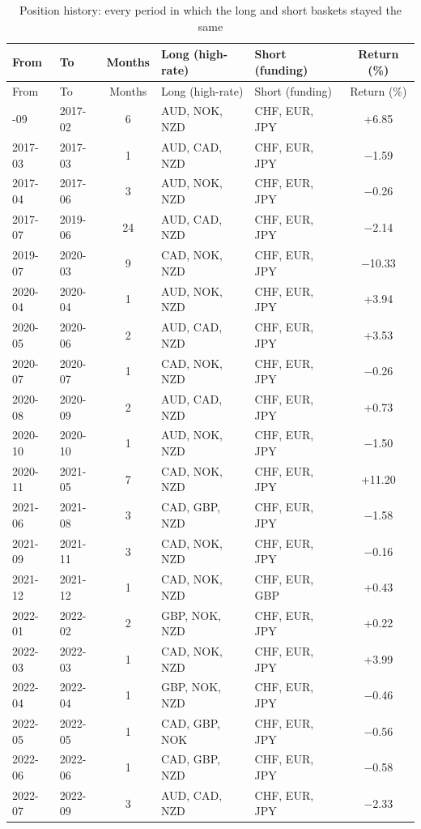 \documentclass[11pt,a4paper]{article}
\begin{document}
{\small
\begin{longtable}{llcp{3.6cm}p{3.6cm}c}
\caption{Position history: every period in which the long and short baskets stayed the same}\label{tab:history}\\
\toprule From & To & Months & Long (high-rate) & Short (funding) & Return (\%) \\ \midrule \endfirsthead
\toprule From & To & Months & Long (high-rate) & Short (funding) & Return (\%) \\ \midrule \endhead
\bottomrule \endlastfoot
2016-09 & 2017-02 & 6 & AUD, NOK, NZD & CHF, EUR, JPY & +6.85 \\
2017-03 & 2017-03 & 1 & AUD, CAD, NZD & CHF, EUR, JPY & $-$1.59 \\
2017-04 & 2017-06 & 3 & AUD, NOK, NZD & CHF, EUR, JPY & $-$0.26 \\
2017-07 & 2019-06 & 24 & AUD, CAD, NZD & CHF, EUR, JPY & $-$2.14 \\
2019-07 & 2020-03 & 9 & CAD, NOK, NZD & CHF, EUR, JPY & $-$10.33 \\
2020-04 & 2020-04 & 1 & AUD, NOK, NZD & CHF, EUR, JPY & +3.94 \\
2020-05 & 2020-06 & 2 & AUD, CAD, NZD & CHF, EUR, JPY & +3.53 \\
2020-07 & 2020-07 & 1 & CAD, NOK, NZD & CHF, EUR, JPY & $-$0.26 \\
2020-08 & 2020-09 & 2 & AUD, CAD, NZD & CHF, EUR, JPY & +0.73 \\
2020-10 & 2020-10 & 1 & AUD, NOK, NZD & CHF, EUR, JPY & $-$1.50 \\
2020-11 & 2021-05 & 7 & CAD, NOK, NZD & CHF, EUR, JPY & +11.20 \\
2021-06 & 2021-08 & 3 & CAD, GBP, NZD & CHF, EUR, JPY & $-$1.58 \\
2021-09 & 2021-11 & 3 & CAD, NOK, NZD & CHF, EUR, JPY & $-$0.16 \\
2021-12 & 2021-12 & 1 & CAD, NOK, NZD & CHF, EUR, GBP & +0.43 \\
2022-01 & 2022-02 & 2 & GBP, NOK, NZD & CHF, EUR, JPY & +0.22 \\
2022-03 & 2022-03 & 1 & CAD, NOK, NZD & CHF, EUR, JPY & +3.99 \\
2022-04 & 2022-04 & 1 & GBP, NOK, NZD & CHF, EUR, JPY & $-$0.46 \\
2022-05 & 2022-05 & 1 & CAD, GBP, NOK & CHF, EUR, JPY & $-$0.56 \\
2022-06 & 2022-06 & 1 & CAD, GBP, NZD & CHF, EUR, JPY & $-$0.58 \\
2022-07 & 2022-09 & 3 & AUD, CAD, NZD & CHF, EUR, JPY & $-$2.33 \\

\end{longtable}}
\end{document}
